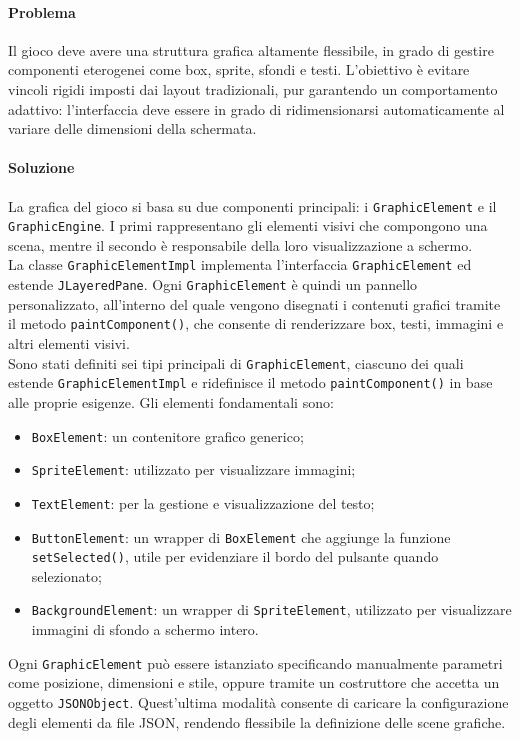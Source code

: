 \documentclass[a4paper,12pt]{report}
\begin{document}
{{\paragraph{Problema} 
Il gioco deve avere una struttura grafica altamente flessibile, in grado di gestire componenti eterogenei come box, sprite, sfondi e testi. L'obiettivo è evitare vincoli rigidi imposti dai layout tradizionali, pur garantendo un comportamento adattivo: l'interfaccia deve essere in grado di ridimensionarsi automaticamente al variare delle dimensioni della schermata.

\paragraph{Soluzione}
La grafica del gioco si basa su due componenti principali: i \texttt{GraphicElement} e il \texttt{GraphicEngine}. I primi rappresentano gli elementi visivi che compongono una scena, mentre il secondo è responsabile della loro visualizzazione a schermo.\\La classe \texttt{GraphicElementImpl} implementa l'interfaccia \texttt{GraphicElement} ed estende \texttt{JLayeredPane}. Ogni \texttt{GraphicElement} è quindi un pannello personalizzato, all'interno del quale vengono disegnati i contenuti grafici tramite il metodo \texttt{paintComponent()}, che consente di renderizzare box, testi, immagini e altri elementi visivi.\\
Sono stati definiti sei tipi principali di \texttt{GraphicElement}, ciascuno dei quali estende \texttt{GraphicElementImpl} e ridefinisce il metodo \texttt{paintComponent()} in base alle proprie esigenze. Gli elementi fondamentali sono:
\begin{itemize}
    \item \texttt{BoxElement}: un contenitore grafico generico;
    \item \texttt{SpriteElement}: utilizzato per visualizzare immagini;
    \item \texttt{TextElement}: per la gestione e visualizzazione del testo;
    \item \texttt{ButtonElement}: un wrapper di \texttt{BoxElement} che aggiunge la funzione \texttt{setSelected()}, utile per evidenziare il bordo del pulsante quando selezionato;
    \item \texttt{BackgroundElement}: un wrapper di \texttt{SpriteElement}, utilizzato per visualizzare immagini di sfondo a schermo intero.
\end{itemize}
Ogni \texttt{GraphicElement} può essere istanziato specificando manualmente parametri come posizione, dimensioni e stile, oppure tramite un costruttore che accetta un oggetto \texttt{JSONObject}. Quest’ultima modalità consente di caricare la configurazione degli elementi da file JSON, rendendo flessibile la definizione delle scene grafiche.\\
}}
\end{document}
